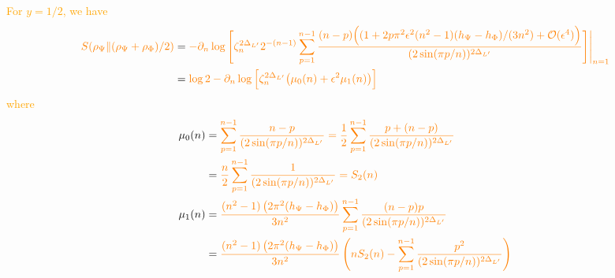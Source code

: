 \documentclass[11pt]{article}
\newcommand{\ep}{\epsilon}
\newcommand{\p}{\partial}
\newcommand{\mO}{\mathcal{O}}
\newcommand{\nn}{\nonumber}
\newcommand{\lb}{\left(}
\newcommand{\rb}{\right)}
\newcommand{\JM}[1]{\textcolor{orange}{#1}}
\begin{document}
\JM{For $y = 1/2$, we have}
\begin{align}
    \JM{S(\rho_{\Psi}\| (\rho_\Psi + \rho_\Phi)/2)} &= \JM{-\p_n \log \Bigg [ \zeta^{2\Delta_{L'}}_n 2^{-(n-1)}\sum_{p=1}^{n-1}\frac{(n-p)\Big((1  + 2p\pi^2 \ep^2 (n^2 - 1)(h_\Psi - h_\Phi)/(3n^2) + \mO(\ep^4)\Big)}{(2\sin(\pi p/n))^{2\Delta_{L'}}} \Bigg]\Bigg|_{n=1}} \nn \\
    &=\JM{\log 2 - \p_n \log \Big[  \zeta_n^{2\Delta_{L'} }\big( \mu_0(n) + \ep^2 \mu_1(n)\big)\Big]}
\end{align}
\JM{where}
\begin{align}
  \mu_0(n)&=\JM{\sum_{p=1}^{n-1}\frac{n-p}{(2\sin(\pi p/n))^{2\Delta_{L'}}}=\frac{1}{2}\sum_{p=1}^{n-1}\frac{p+(n-p)}{(2\sin(\pi p/n))^{2\Delta_{L'}}}}\nn\\
  &=\JM{\frac{n}{2}\sum_{p=1}^{n-1}\frac{1}{(2\sin(\pi p/n))^{2\Delta_{L'}}}=S_2(n) }\\
  \mu_1(n) &= \JM{\frac{(n^2-1)\lb2\pi^2 (h_\Psi - h_\Phi)\rb}{3n^2}\sum_{p=1}^{n-1} \frac{(n-p)p}{(2\sin(\pi p/n))^{2\Delta_{L'}}}}\nn \\
  &= \JM{\frac{(n^2-1)\lb2\pi^2 (h_\Psi - h_\Phi)\rb}{3n^2} \lb nS_2(n) - \sum_{p=1}^{n-1}\frac{p^2}{(2\sin(\pi p/n))^{2\Delta_{L'}}}\rb} 
\end{align}
\end{document}
